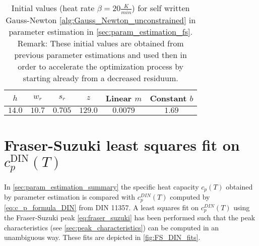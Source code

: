 \documentclass{scrartcl}[12pt, halfparskip]
\numberwithin{equation}{section}
\numberwithin{figure}{section}
\numberwithin{table}{section}
\begin{document}
\begin{table}[H]
	\centering
	\caption{Initial values (heat rate $\beta=20 \frac{K}{min}$) for self written Gauss-Newton \cref{alg:Gauss_Newton_unconstrained} in parameter estimation in \cref{sec:param_estimation_fs}. \\
		Remark: These initial values are obtained from previous parameter estimations and used then in order to accelerate the optimization process by starting already from a decreased residuum.}
	\begin{tabular}{| c | c | c | c | c | c |} \hline
		$h$ & $w_r$ & $s_r$ & $z$ & Linear $m$ & Constant $b$ \\ \hline
		$14.0$ & $10.7$ & $0.705$ & $129.0$ & $0.0079$ & $1.69$ \\ \hline
	\end{tabular}
	\label{tab:initial_values_FS}
\end{table}





\section{Fraser-Suzuki least squares fit on $c_p^{\text{DIN}}(T)$}
\label{sec:FS_DIN_fits}

In \cref{sec:param_estimation_summary} the specific heat capacity $c_p(T)$ obtained by parameter estimation is compared with $c_p^{DIN}(T)$ computed by \cref{eq:c_p_formula_DIN} from DIN 11357. A least squares fit on $c_p^{DIN}(T)$ using the Fraser-Suzuki peak \cref{eq:fraser_suzuki} has been performed such that the peak characteristics (see \cref{sec:peak_characteristics}) can be computed in an unambiguous way. These fits are depicted in \cref{fig:FS_DIN_fits}.
\end{document}
